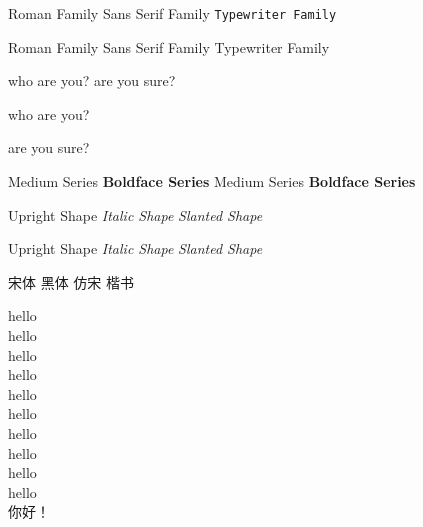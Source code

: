 \documentclass[10pt]{article}
\begin{document}
    \textrm{Roman Family}
    \textsf{Sans Serif Family}
    \texttt{Typewriter Family}


    \rmfamily Roman Family {\sffamily Sans Serif Family} {\ttfamily Typewriter Family}

    \rmfamily who are you?
    are you sure?

    \sffamily who are you?
    
    are you sure?

    \textmd{Medium Series}
    \textbf{Boldface Series}
    {\mdseries Medium Series}
    {\bfseries Boldface Series}

    \textup{Upright Shape}
    \textit{Italic Shape}
    \textsl{Slanted Shape}

    {\upshape Upright Shape}
    {\itshape Italic Shape}
    {\slshape Slanted Shape}

    {\songti 宋体}
    {\heiti 黑体}
    {\fangsong 仿宋}
    {\kaishu 楷书}


    {\tiny             hello}\\
    {\scriptsize       hello}\\
    {\footnotesize     hello}\\
    {\small            hello}\\
    {\normalsize       hello}\\
    {\large            hello}\\
    {\Large            hello}\\
    {\LARGE            hello}\\
    {\huge             hello}\\
    {\Huge             hello}\\

     你好！
\end{document}
